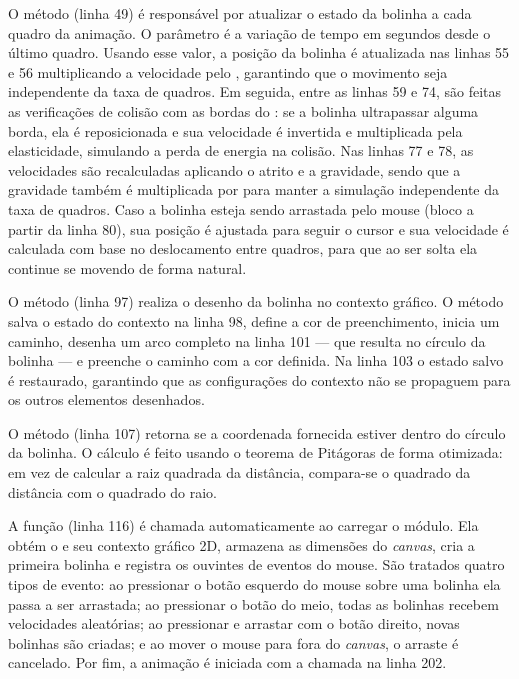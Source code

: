 O método  (linha 49) é responsável por atualizar o estado da bolinha a cada quadro da animação. O parâmetro  é a variação de tempo em segundos desde o último quadro. Usando esse valor, a posição da bolinha é atualizada nas linhas 55 e 56 multiplicando a velocidade pelo , garantindo que o movimento seja independente da taxa de quadros. Em seguida, entre as linhas 59 e 74, são feitas as verificações de colisão com as bordas do : se a bolinha ultrapassar alguma borda, ela é reposicionada e sua velocidade é invertida e multiplicada pela elasticidade, simulando a perda de energia na colisão. Nas linhas 77 e 78, as velocidades são recalculadas aplicando o atrito e a gravidade, sendo que a gravidade também é multiplicada por  para manter a simulação independente da taxa de quadros. Caso a bolinha esteja sendo arrastada pelo mouse (bloco  a partir da linha 80), sua posição é ajustada para seguir o cursor e sua velocidade é calculada com base no deslocamento entre quadros, para que ao ser solta ela continue se movendo de forma natural.

O método  (linha 97) realiza o desenho da bolinha no contexto gráfico. O método salva o estado do contexto na linha 98, define a cor de preenchimento, inicia um caminho, desenha um arco completo na linha 101 --- que resulta no círculo da bolinha --- e preenche o caminho com a cor definida. Na linha 103 o estado salvo é restaurado, garantindo que as configurações do contexto não se propaguem para os outros elementos desenhados.

O método  (linha 107) retorna  se a coordenada fornecida estiver dentro do círculo da bolinha. O cálculo é feito usando o teorema de Pitágoras de forma otimizada: em vez de calcular a raiz quadrada da distância, compara-se o quadrado da distância com o quadrado do raio.

A função  (linha 116) é chamada automaticamente ao carregar o módulo. Ela obtém o  e seu contexto gráfico 2D, armazena as dimensões do \textit{canvas}, cria a primeira bolinha e registra os ouvintes de eventos do mouse. São tratados quatro tipos de evento: ao pressionar o botão esquerdo do mouse sobre uma bolinha ela passa a ser arrastada; ao pressionar o botão do meio, todas as bolinhas recebem velocidades aleatórias; ao pressionar e arrastar com o botão direito, novas bolinhas são criadas; e ao mover o mouse para fora do \textit{canvas}, o arraste é cancelado. Por fim, a animação é iniciada com a chamada  na linha 202.

